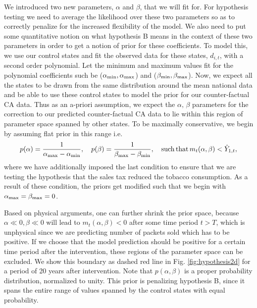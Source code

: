 \documentclass{article}
\begin{document}
We introduced two new parameters, $\alpha$ and $\beta$, that we will fit for.
For hypothesis testing we need to average the likelihood over these two parameters so as to correctly penalize for the increased flexibility of the model. 
We also need to put some quantitative notion on what hypothesis B means in the context of these two parameters in order to get a notion of prior for these coefficients. 
To model this, we use our control states and fit the observed data for these states, $d_{i, t}$, with a second order polynomial. Let the minimum and maximum values fit for the polynomial coefficients such be ($\alpha_{\rm min}, \alpha_{\rm max}$) and ($\beta_{\rm min}, \beta_{\rm max}$). Now, we expect all the states to be drawn from the same distribution around the mean national data and be able to use these control states to model the prior for our counter-factual CA data. Thus as an a-priori assumption, we expect the $\alpha,\, \beta$ parameters for the correction to our predicted counter-factual CA data to lie within this region of parameter space spanned by other states. To be maximally conservative, we begin by assuming flat prior in this range i.e.
\begin{equation}
p(\alpha)= \frac{1}{\alpha_{\rm max}-\alpha_{\rm min}}, \quad 
p(\beta)= \frac{1}{\beta_{\rm max}-\beta_{\rm min}},\quad {\rm such\, that} \, m_t(\alpha,\beta) < \hat{Y}_{1, t},
\label{eq:priorab}
\end{equation}
where we have additionally imposed the last condition to ensure that we are testing the hypothesis that the sales tax reduced the tobacco consumption. As a result of these condition, the priors get modified such that we begin with $\alpha_{\rm max} = \beta_{\rm max} = 0$.

Based on physical arguments, one can further shrink the prior space, 
because
$\alpha\ll 0, \beta\ll 0$ will lead to $m_t(\alpha,\beta)<0$ after some time period $t>T$, which is unphysical since we are predicting number of packets sold which has to be positive.
If we choose that the model prediction should be positive for a certain time period after the intervention, these regions of the parameter space can be excluded.
We show this boundary as dashed red line in Fig. \ref{fig:hypothesis2d} for a period of 20 years after intervention. 
Note that $p(\alpha,\beta)$ is a proper probability distribution, normalized to unity. 
This prior is penalizing hypothesis B, since it spans the entire range of values spanned by the control states with equal probability.
\end{document}
